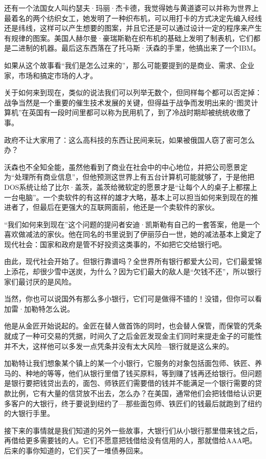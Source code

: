 还有一个法国女人叫约瑟夫·玛丽·杰卡德，我觉得她与黄道婆可以并称为世界上最着名的两个纺织女工，她发明了一种织布机，可以用打卡的方式决定先编入经线还是纬线，这样可以产生想要的图案，并且它还是可以通过设计一定的程序来产生有规律的图案。美国人赫尔曼·豪瑞斯勒在织布机的基础上发明了制表机，它们都是二进制的机器。最后这东西落在了托马斯·沃森的手里，他搞出来了一个IBM。

如果从这个故事看``我们是怎么过来的''，那么可能要提到的是商业、需求、企业家，市场和搞定市场的人才。

关于如何来到现在，类似的说法我们可以列举无数个，但同样每个都可以否定掉：战争当然是一个重要的催生技术发展的关键，但得益于战争而发明出来的``图灵计算机''在英国有一段时间里都可以称为民用机了，到了冷战时期却被统统收缴了事。

政府不让大家用了：这么高科技的东西让民间来玩，如果被俄国人窃了密可怎么办？

沃森也不全知全能，虽然他看到了商业在社会中的中心地位，并把公司愿景定为``处理所有商业信息''，但他预测这世界上有五台计算机可能就够了，于是他把DOS系统让给了比尔·盖茨，盖茨给微软定的愿景才是``让每个人的桌子上都摆上一台电脑''。一个卖软件的有这样的雄才大略，基本上可以担当如何来到现在的推进者了，但最后在更强大的互联网面前，他还是一个卖软件的家伙。

``我们如何来到现在''这个问题的提问者安迪·凯斯勒有自己的一套答案，他是一个喜欢做减法的家伙。他在同名的书里说到了伊丽莎白一世，她的减法基本上奠定了现代社会：国家和政府是管不好投资这类事的，不如把它交给银行吧。

由此，现代社会开始了。但银行靠谱吗？全世界所有银行都爱大公司，它们最爱锦上添花，却很少雪中送炭，为什么？因为它们最大的敌人是``欠钱不还''，所以银行家们最讨厌的是风险。

当然，你也可以说国外有那么多小银行，它们可是做得不错的！没错，但你可以看加雷·加勒特怎么说。

他是从金匠开始说起的。金匠在替人做首饰的同时，也会替人保管，而保管的凭条就成了一种可交易的凭据，时间久了之后金匠发现金主们同时来提走金子的可能性并不大，这样他可以多发一点凭条并没有太大风险---银行就是这么来的。

加勒特让我们想象某个镇上的某一个小银行，它服务的对象包括面包师、铁匠、养马的、种地的等等，他们从银行里借了钱买原料，等到赚了钱再还给银行。但问题是银行要把钱贷出去的，面包、师铁匠们需要借的钱并不能满足一个银行需要的贷款比例，它有大量的信贷放不出去，怎么办？在美国，通常他们会把钱借给认识更多客户的大银行，终于要说到纽约了---那些面包师、铁匠们的钱最后就跑到了纽约的大银行手里。

接下来的事情就是我们知道的另外一些故事，大银行们从小银行那里借来钱之后，再借给更多需要钱的人。它们不愿意把钱借给没有信用的人，那就借给AAA吧。后来的事你知道的，它们买了一堆债券回来。

